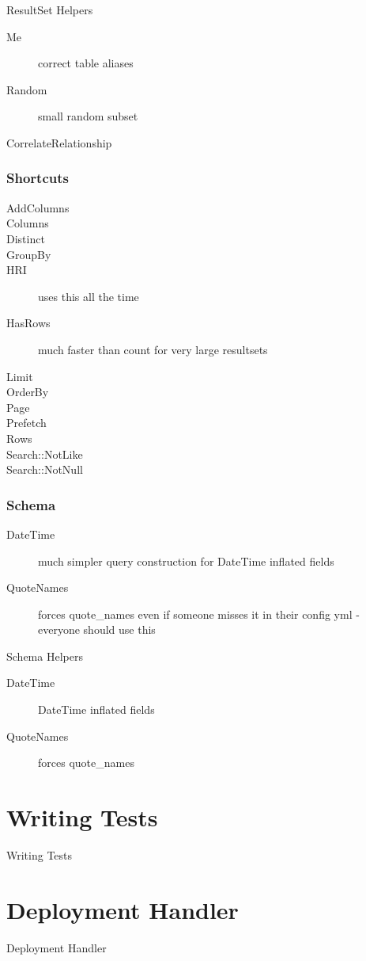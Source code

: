 \begin{frame}{ResultSet Helpers}
\begin{description}
\item[Me] correct table aliases
\item[Random] small random subset
\item[CorrelateRelationship]  
\end{description}
\end{frame}

\subsubsection{Shortcuts}
\begin{description}
\item[AddColumns] 
\item[Columns]
\item[Distinct]
\item[GroupBy] 
\item[HRI]
uses this all the time
\item[HasRows] much faster than count for very large resultsets
\item[Limit]
\item[OrderBy]
\item[Page]
\item[Prefetch]
\item[Rows]
\item[Search::{Not}Like]
\item[Search::{Not}Null] 
\end{description}

\subsubsection{Schema}
\begin{description}
\item[DateTime]
much simpler query construction for DateTime inflated fields
\item[QuoteNames] 
forces quote\_names even if someone misses it in their 
config yml - everyone should use this
\end{description}

\begin{frame}{Schema Helpers}
\begin{description}
\item[DateTime] DateTime inflated fields
\item[QuoteNames] forces quote\_names
\end{description}
\end{frame}

\section{Writing Tests}
\begin{frame}{Writing Tests}
\end{frame}

\section{Deployment Handler}
\begin{frame}{Deployment Handler}
\end{frame}



